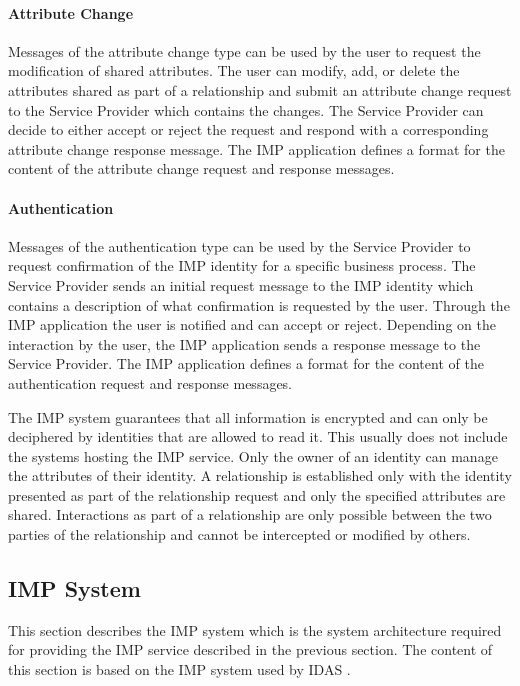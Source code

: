 \paragraph{Attribute Change} Messages of the attribute change type can be used by the user to request the modification of shared attributes. The user can modify, add, or delete the attributes shared as part of a relationship and submit an attribute change request to the Service Provider which contains the changes. The Service Provider can decide to either accept or reject the request and respond with a corresponding attribute change response message. 
The IMP application defines a format for the content of the attribute change request and response messages.

\paragraph{Authentication} Messages of the authentication type can be used by the Service Provider to request confirmation of the IMP identity for a specific business process. The Service Provider sends an initial request message to the IMP identity which contains a description of what confirmation is requested by the user. Through the IMP application the user is notified and can accept or reject. Depending on the interaction by the user, the IMP application sends a response message to the Service Provider. 
The IMP application defines a format for the content of the authentication request and response messages.

The IMP system guarantees that all information is encrypted and can only be deciphered by identities that are allowed to read it. This usually does not include the systems hosting the IMP service. Only the owner of an identity can manage the attributes of their identity. A relationship is established only with the identity presented as part of the relationship request and only the specified attributes are shared. Interactions as part of a relationship are only possible between the two parties of the relationship and cannot be intercepted or modified by others.

\subsection{IMP System} \label{section:imp_system}
This section describes the IMP system which is the system architecture required for providing the IMP service described in the previous section. The content of this section is based on the IMP system used by IDAS \cite{idas}.

